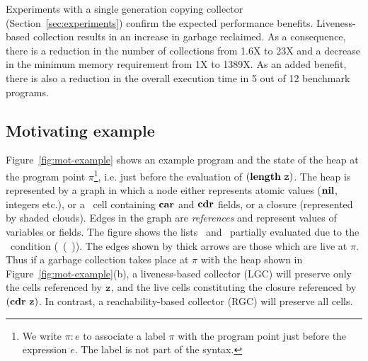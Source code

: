 \documentclass[9pt]{sigplanconf}
\begin{document}
Experiments    with   a    single    generation   copying    collector
(Section~\ref{sec:experiments})   confirm  the   expected  performance
benefits.  Liveness-based collection results in an increase in garbage
reclaimed.  As  a consequence, there is  a reduction in the  number of
collections from 1.6X  to 23X and a decrease  in the minimum
memory requirement from  1X to 1389X.  As  an added benefit,
there is also a reduction in the overall execution time in 5 out of 12
benchmark programs.
 

\subsection{Motivating example}
\label{sec:motiv}
   Figure~\ref{fig:mot-example}   shows  an   example
program and the state of the heap at the program point $\pi$\footnote{We write
$\pi\!:\!e$ to  associate a  label $\pi$ with  the program  point just
before  the  expression  $e$. The label is not part of the syntax.},  i.e. just  before  the  evaluation  of
$(\mathbf{length}\ \mbox{\tt z})$.  The heap is represented  by a graph in which a node
either  represents  atomic  values   ($\mbox{$\mathbf{ nil}$}$,  integers  etc.),  or  a
\CONS\  cell  containing  $\mbox{$\mathbf{car}$}$  and  $\mbox{$\mathbf{cdr}$}$  fields,  or  a  closure
(represented  by  shaded  clouds).   Edges   in  the  graph  are  {\em
  references} and represent values of variables or fields.  The figure
shows the  lists \px\  and \pz\  partially evaluated  due to  the
\SIF\ condition 
(\NULLQ~(\CAR~\pz)).
The edges  shown by thick  arrows are those  which are live  at $\pi$.
Thus if a garbage collection takes  place at $\pi$ with the heap shown
in Figure~\ref{fig:mot-example}(b),  a liveness-based  collector (LGC)
will preserve only  the cells referenced by $\mbox{\tt z}$, and  the live cells
constituting the  closure referenced by $(\mbox{$\mathbf{cdr}$}~\mbox{\tt z})$.   In contrast, a
reachability-based collector (RGC) will preserve all cells.
\end{document}
